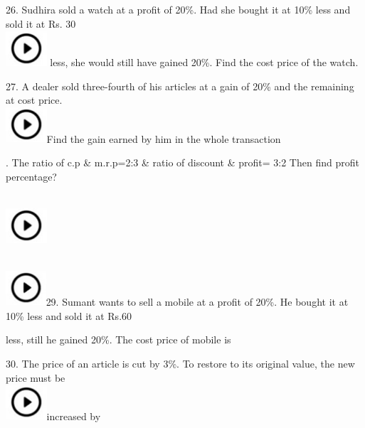 \documentclass{article} %
\begin{document}
\noindent 

26. Sudhira sold a watch at a profit of 20\%. Had she bought it at 10\% less and sold it at Rs. 30  
\noindent \\ \includegraphics*[width=0.60in, height=0.52in]{images/image1} less, she would still have gained 20\%. Find the cost price of the watch.

\noindent 

27. A dealer sold three-fourth of his articles at a gain of 20\% and the remaining at cost price.  
\noindent \\ \includegraphics*[width=0.60in, height=0.52in]{images/image1}Find the gain earned by him in the whole transaction

\noindent 

\noindent 

\noindent 

. The ratio of c.p \& m.r.p=2:3 \& ratio of discount \& profit= 3:2 Then find profit percentage?

\noindent  
\noindent \\ \includegraphics*[width=0.60in, height=0.52in]{images/image1}

\noindent 

\noindent  
\noindent \\ \includegraphics*[width=0.59in, height=0.52in]{images/image1}29. Sumant wants to sell a mobile at a profit of 20\%. He bought it at 10\% less and sold it at Rs.60

\noindent 

\noindent less, still he gained 20\%. The cost price of mobile is

\noindent 

30. The price of an article is cut by 3\%. To restore to its original value, the new price must be  
\noindent \\ \includegraphics*[width=0.60in, height=0.52in]{images/image1}increased by
\end{document}
